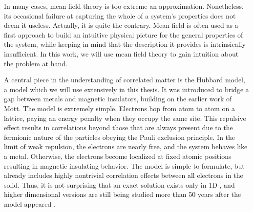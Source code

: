 In many cases, mean field theory is too extreme an approximation.
Nonetheless, its occasional failure at capturing the whole of a system's properties does not deem it  useless.
Actually, it is quite the contrary.
Mean field is often used as a first approach to build an intuitive physical picture for the general properties of the system, while keeping in mind that the description it provides is intrinsically insufficient.
In this work, we will use mean field theory to gain intuition about the problem at hand.

A central piece in the understanding of correlated matter is the Hubbard model, a model which we will use extensively in this thesis.
It was introduced to bridge a gap between metals and magnetic insulators, building on the earlier work of Mott.
The model is extremely simple.
Electrons hop from atom to atom on a lattice, paying an energy penalty when they occupy the same site.
This repulsive effect results in correlations beyond those that are always present due to the fermionic nature of the particles obeying the Pauli exclusion principle.
In the limit of weak repulsion, the electrons are nearly free, and the system behaves like a metal.
Otherwise, the electrons become localized at fixed atomic positions resulting in magnetic insulating behavior.
The model is simple to formulate, but already includes highly nontrivial  correlation effects between all electrons in the solid.
Thus, it is not surprising that an exact solution exists only in \acs{1D} \cite{lieb_absence_1968}, and higher dimensional versions are still being studied more than 50 years after the model appeared \cite{hubbard_electron_1963}.